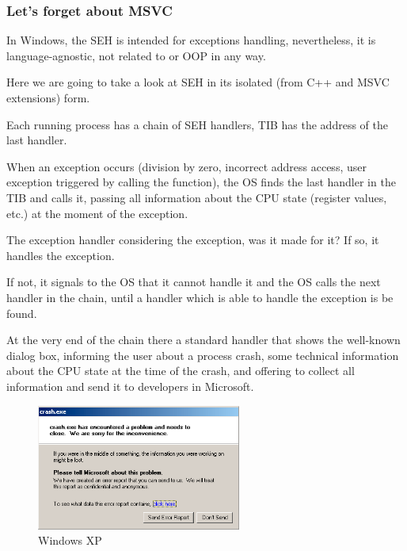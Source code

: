 \subsubsection{Let's forget about MSVC}

In Windows, the \ac{SEH} is intended for exceptions handling, nevertheless, it is language-agnostic,
not related to \Cpp or \ac{OOP} in any way.

Here we are going to take a look at \ac{SEH} in its isolated (from C++ and MSVC extensions) form.


Each running process has a chain of \ac{SEH} handlers, \ac{TIB} has the address of the last handler.

When an exception occurs (division by zero, incorrect address access, user exception triggered by
calling the  function), the \ac{OS} finds the last handler in the \ac{TIB} and calls it,
passing all information about the \ac{CPU} state (register values, etc.) at the moment of the exception.

The exception handler considering the exception, was it made for it?
If so, it handles the exception.

If not, it signals to the \ac{OS} that it
cannot handle it and the \ac{OS} calls the next handler in the chain,
until a handler which is able to handle the exception is be found.

At the very end of the chain there a standard handler that shows the well-known dialog box, informing the user about a
process crash, some technical information about the \ac{CPU} state at the time of the crash,
and offering to collect all information and send it to developers in Microsoft. 

\begin{figure}[H]
\centering
\includegraphics[width=0.6\textwidth]{OS/SEH/1/crash_xp1.png}
\caption{Windows XP}
\end{figure}

